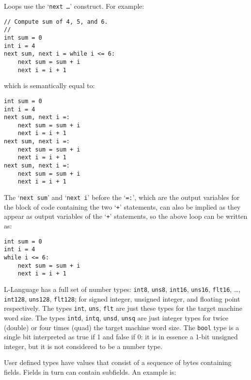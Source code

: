 \documentclass[12pt]{article}
\newenvironment{indpar}[1][0.3in]%
	{\begin{list}{}%
		     {\setlength{\itemsep}{0in}%
		      \setlength{\topsep}{0in}%
		      \setlength{\parsep}{1ex}%
		      \setlength{\labelwidth}{#1}%
		      \setlength{\leftmargin}{#1}%
		      \addtolength{\leftmargin}{\labelsep}}%
	 \item}%
	{\end{list}}
\begin{document}
Loops use the `{\tt next \ldots}' construct.  For example:
\begin{indpar}\begin{verbatim}
// Compute sum of 4, 5, and 6.
//
int sum = 0
int i = 4
next sum, next i = while i <= 6:
    next sum = sum + i
    next i = i + 1
\end{verbatim}\end{indpar}
which is semantically equal to:
\begin{indpar}\begin{verbatim}
int sum = 0
int i = 4
next sum, next i =:
    next sum = sum + i
    next i = i + 1
next sum, next i =:
    next sum = sum + i
    next i = i + 1
next sum, next i =:
    next sum = sum + i
    next i = i + 1
\end{verbatim}\end{indpar}
The `{\tt next sum}' and `{\tt next i}' before the `{\tt =:}',
which are the output variables for the block of code containing
the two `{\tt +}' statements,
can also be implied as they appear as output variables
of the `{\tt +}' statements, so the above loop can be written as:
\begin{indpar}\begin{verbatim}
int sum = 0
int i = 4
while i <= 6:
    next sum = sum + i
    next i = i + 1
\end{verbatim}\end{indpar}

L-Language has a full set of number types:
{\tt int8}, {\tt uns8},
{\tt int16}, {\tt uns16}, {\tt flt16}, \ldots,
{\tt int128}, {\tt uns128}, {\tt flt128}; for signed integer,
unsigned integer, and floating point respectively.
The types {\tt int}, {\tt uns}, {\tt flt} are just these
types for the target machine word size.
The types {\tt intd}, {\tt intq}, {\tt unsd}, {\tt unsq} are just integer
types for twice (double) or four times (quad) the target machine word size.
The {\tt bool} type is a single bit interpreted as true if
1 and false if 0: it is in essence a 1-bit unsigned integer, but it
is not considered to be a number type.

User defined types have values that
consist of a sequence of bytes containing fields.
Fields in turn can contain subfields.
An example is:
\end{document}

